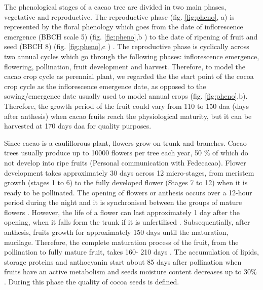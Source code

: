 \documentclass[gene,journal,article,submit,moreauthors,pdftex]{Definitions/mdpi}
\begin{document}
The phenological stages of a cacao tree are divided in two main phases, vegetative and reproductive. The reproductive phase (fig. \ref{fig:pheno}, a) is represented by the floral phenology which goes from the date of inflorescence emergence (BBCH scale 5) (fig. \ref{fig:pheno},b ) to the date of ripening of fruit and seed (BBCH 8) (fig. \ref{fig:pheno},c ) \citep{Niemenak2010}. The reproductive phase is cyclically across two annual cycles which go through the following phases: inflorescence emergence, flowering, pollination, fruit development and harvest. Therefore, to model the cacao crop cycle as perennial plant, we regarded the the start point of the cocoa crop cycle as the inflorescence emergence date, as opposed to the sowing/emergence date usually used to model annual crops (fig. \ref{fig:pheno},b). Therefore, the growth period of the fruit could vary from 110 to 150 daa (days after anthesis) \citep{lopez2018} when cacao fruits reach the physiological maturity, but it can be harvested at 170 days daa \citep{Niemenak2010} for quality purposes.

Since cacao is a cauliflorous plant, flowers grow on trunk and branches. Cacao trees usually produce up to 10000 flowers per tree each year, 50 \%  of which do not develop into ripe fruits (Personal communication with Fedecacao). Flower development takes approximately 30 days across 12 micro-stages, from meristem growth (stages 1 to 6) to the fully developed flower (Stages 7 to 12) \citep{swanson2005, lopez2018} when it is ready to be pollinated. The opening of flowers or anthesis  occurs over a 12-hour period during the night and it is synchronised between the groups of mature flowers \citep{Niemenak2010}. However, the life of a flower can last approximately 1 day after the opening, when it falls form the trunk if it is unfertilised \citep{cheesman1927, Niemenak2010}. Subsequentially, after anthesis, fruits growth for approximately 150 days until the maturation, mucilage. Therefore, the complete maturation process of the fruit, from the pollination to fully mature fruit, takes 160- 210 days \citep{berry1994}. The accumulation of lipids, storage proteins and anthocyanin start about 85 days after pollination when fruits have an active metabolism and seeds moisture content decreases up to 30\% \citep{Lehrian1980, Niemenak2010}. During this phase the quality of cocoa seeds is defined.
\end{document}
